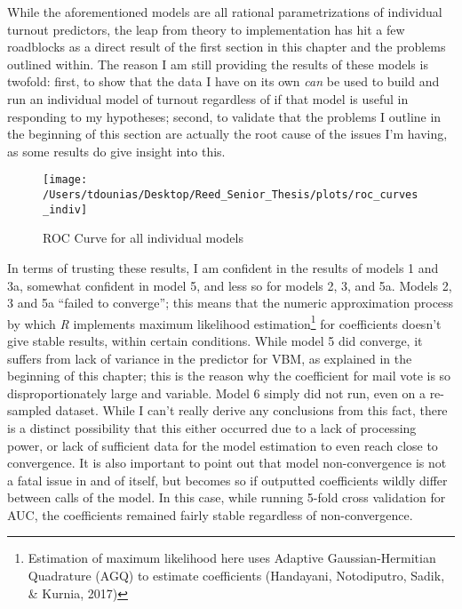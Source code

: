 \documentclass[12pt,twoside]{reedthesis}
\begin{document}
  While the aforementioned models are all rational parametrizations of
  individual turnout predictors, the leap from theory to implementation
  has hit a few roadblocks as a direct result of the first section in this
  chapter and the problems outlined within. The reason I am still
  providing the results of these models is twofold: first, to show that
  the data I have on its own \emph{can} be used to build and run an
  individual model of turnout regardless of if that model is useful in
  responding to my hypotheses; second, to validate that the problems I
  outline in the beginning of this section are actually the root cause of
  the issues I'm having, as some results do give insight into this.
  
  \begin{figure}
  
  {\centering \texttt{[image: /Users/tdounias/Desktop/Reed\_Senior\_Thesis/plots/roc\_curves\_indiv]} 
  
  }
  
  \caption[ROC Curve for all individual models]{ROC Curve for all individual models}\label{fig:roc the curves}
  \end{figure}
  
  In terms of trusting these results, I am confident in the results of
  models 1 and 3a, somewhat confident in model 5, and less so for models
  2, 3, and 5a. Models 2, 3 and 5a ``failed to converge''; this means that
  the numeric approximation process by which \textit{R} implements maximum
  likelihood estimation\footnote{Estimation of maximum likelihood here
    uses Adaptive Gaussian-Hermitian Quadrature (AGQ) to estimate
    coefficients (Handayani, Notodiputro, Sadik, \& Kurnia, 2017)} for
  coefficients doesn't give stable results, within certain conditions.
  While model 5 did converge, it suffers from lack of variance in the
  predictor for VBM, as explained in the beginning of this chapter; this
  is the reason why the coefficient for mail vote is so disproportionately
  large and variable. Model 6 simply did not run, even on a re-sampled
  dataset. While I can't really derive any conclusions from this fact,
  there is a distinct possibility that this either occurred due to a lack
  of processing power, or lack of sufficient data for the model estimation
  to even reach close to convergence. It is also important to point out
  that model non-convergence is not a fatal issue in and of itself, but
  becomes so if outputted coefficients wildly differ between calls of the
  model. In this case, while running 5-fold cross validation for AUC, the
  coefficients remained fairly stable regardless of non-convergence.
  
\end{document}
